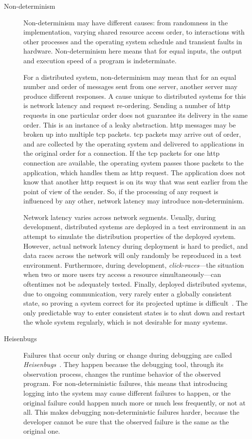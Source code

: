 \begin{description}
\item[Non-determinism] Non-determinism may have different causes: from
  randomness in the implementation, varying shared resource access
  order, to interactions with other processes and the operating system
  schedule and transient faults in hardware. Non-determinism here
  means that for equal inputs, the output and execution speed of a
  program is indeterminate.

  For a distributed system, non-determinism may mean that for an equal
  number and order of messages sent from one server, another server
  may produce different responses. A cause unique to distributed
  systems for this is network latency and request re-ordering. Sending
  a number of \ac{http} requests in one particular order does not
  guarantee its delivery in the same order. This is an instance of a
  leaky abstraction. \ac{http} messages may be broken up into multiple
  \ac{tcp} packets. \ac{tcp} packets may arrive out of order, and are
  collected by the operating system and delivered to applications in
  the original order for a connection. If the \ac{tcp} packets for one
  \ac{http} connection are available, the operating system passes
  those packets to the application, which handles them as \ac{http}
  request. The application does not know that another \ac{http}
  request is on its way that was sent earlier from the point of view
  of the sender. So, if the processing of any request is influenced by
  any other, network latency may introduce non-determinism.

  Network latency varies across network segments. Usually, during
  development, distributed systems are deployed in a test environment
  in an attempt to simulate the distribution properties of the
  deployed system. However, actual network latency during deployment
  is hard to predict, and data races across the network will only
  randomly be reproduced in a test environment. Furthermore, during
  development, \emph{click-races}---the situation when two or more
  users try access a resource simultaneously---can oftentimes not be
  adequately tested. Finally, deployed distributed systems, due to
  ongoing communication, very rarely enter a globally consistent
  state, so proving a system correct for its projected uptime is
  difficult~\cite{Geels2006Replay}. The only predictable way to enter
  consistent states is to shut down and restart the whole system
  regularly, which is not desirable for many systems.
\item[Heisenbugs] Failures that occur only during or change during
  debugging are called \emph{Heisenbugs}~\cite{Gray1986}. They happen
  because the debugging tool, through its observation process, changes
  the runtime behavior of the observed program. For non-deterministic
  failures, this means that introducing logging into the system may
  cause different failures to happen, or the original failure could
  happen much more or much less frequently, or not at all. This makes
  debugging non-deterministic failures harder, because the developer
  cannot be sure that the observed failure is the same as the original
  one.


\end{description}
